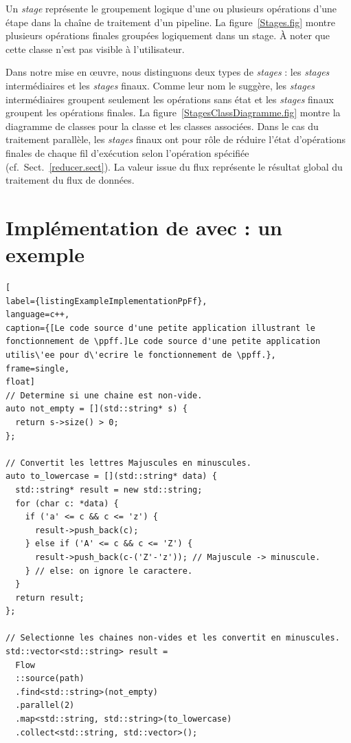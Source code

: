 Un \emph{stage} repr\'esente le groupement logique d'une ou plusieurs op\'erations d'une \'etape dans la cha\^ine de traitement d'un pipeline. La figure~\ref{Stages.fig} montre plusieurs op\'erations finales group\'ees logiquement dans un stage.  \`A noter que cette classe n'est pas visible \`a l'utilisateur. 

Dans notre mise en \oe{}uvre, nous distinguons deux types de \emph{stages} : les \emph{stages} interm\'ediaires et les \emph{stages} finaux. Comme leur nom le sugg\`ere, les \emph{stages} interm\'ediaires groupent seulement les op\'erations sans \'etat et les \emph{stages} finaux groupent les op\'erations finales. La figure~\ref{StagesClassDiagramme.fig} montre la diagramme de classes pour la classe  et les classes associ\'ees. Dans le cas du traitement parall\`ele, les \emph{stages} finaux ont pour r\^ole de r\'eduire l'\'etat d'op\'erations finales de chaque fil d'ex\'ecution selon l'op\'eration sp\'ecifi\'ee (cf.~Sect.~\ref{reducer.sect}). La valeur issue du flux repr\'esente le r\'esultat global du traitement du flux de donn\'ees.



\section{Impl\'ementation de  avec  : un exemple}

\begin{lstlisting}[
label={listingExampleImplementationPpFf},
language=c++,
caption={[Le code source d'une petite application illustrant le fonctionnement de \ppff.]Le code source d'une petite application utilis\'ee pour d\'ecrire le fonctionnement de \ppff.},
frame=single,
float]
// Determine si une chaine est non-vide.
auto not_empty = [](std::string* s) {
  return s->size() > 0;
};
	
// Convertit les lettres Majuscules en minuscules.
auto to_lowercase = [](std::string* data) {
  std::string* result = new std::string;
  for (char c: *data) {
    if ('a' <= c && c <= 'z') {
   	  result->push_back(c);
   	} else if ('A' <= c && c <= 'Z') {
	  result->push_back(c-('Z'-'z')); // Majuscule -> minuscule.
   	} // else: on ignore le caractere.
  }
  return result;	
};

// Selectionne les chaines non-vides et les convertit en minuscules.
std::vector<std::string> result = 
  Flow
  ::source(path)
  .find<std::string>(not_empty)
  .parallel(2)
  .map<std::string, std::string>(to_lowercase)
  .collect<std::string, std::vector>();
\end{lstlisting}


